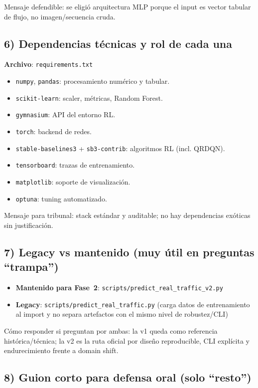 ﻿\documentclass[12pt,a4paper]{article}
\begin{document}
Mensaje defendible: se eligió arquitectura MLP porque el input es vector tabular de flujo, no
imagen/secuencia cruda.

\subsection{6) Dependencias técnicas y rol de cada una}

\textbf{Archivo}: \verb|requirements.txt|

\begin{itemize}
  \item \texttt{numpy}, \texttt{pandas}: procesamiento numérico y tabular.
  \item \texttt{scikit-learn}: scaler, métricas, Random Forest.
  \item \texttt{gymnasium}: API del entorno RL.
  \item \texttt{torch}: backend de redes.
  \item \texttt{stable-baselines3} + \texttt{sb3-contrib}: algoritmos RL (incl. QRDQN).
  \item \texttt{tensorboard}: trazas de entrenamiento.
  \item \texttt{matplotlib}: soporte de visualización.
  \item \texttt{optuna}: tuning automatizado.
\end{itemize}

Mensaje para tribunal: stack estándar y auditable; no hay dependencias exóticas sin justificación.

\subsection{7) Legacy vs mantenido (muy útil en preguntas ``trampa'')}

\begin{itemize}
  \item \textbf{Mantenido para Fase~2}: \verb|scripts/predict_real_traffic_v2.py|
  \item \textbf{Legacy}: \verb|scripts/predict_real_traffic.py| (carga datos de entrenamiento al
        import y no separa artefactos con el mismo nivel de robustez/CLI)
\end{itemize}

Cómo responder si preguntan por ambas: la v1 queda como referencia histórica/técnica; la v2 es la
ruta oficial por diseño reproducible, CLI explícita y endurecimiento frente a domain shift.

\subsection{8) Guion corto para defensa oral (solo ``resto'')}
\end{document}
